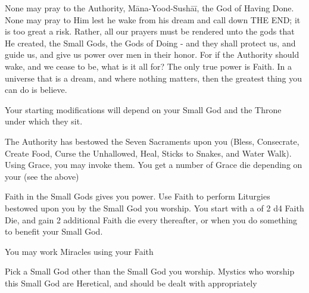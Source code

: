 {  None may pray to the Authority, Māna-Yood-Sushāī, the God of Having Done.  None may pray to Him lest he wake from his dream and call down THE END; it is too great a risk.  Rather, all our prayers must be rendered unto  the gods that He created, the Small Gods, the Gods of Doing - and they shall protect us, and guide us, and give us power over men in their honor.  For if the Authority should wake, and we cease to be, what is it all for?  The only true power is Faith.  In a universe that is a dream, and where nothing matters, then the greatest thing you can do is believe.


  Your starting modifications will depend on your Small God and the Throne under which they sit.\footnotemark


  
  \footnotemark[\value{footnote}] 
  The Authority has bestowed the Seven Sacraments upon you (Bless, Consecrate, Create Food, Curse the Unhallowed, Heal, Sticks to Snakes, and Water Walk). Using Grace, you may invoke them.  You get a number of Grace die depending on your \LVL (see the  above)
  
  \footnotemark[\value{footnote}] 
  Faith in the Small Gods gives you power. Use Faith to perform Liturgies bestowed upon you by the Small God you worship.  You start with a \POOL of 2 d4 Faith Die, and gain 2 additional Faith die every \LVL thereafter, or when you do something to benefit your Small God.

  \footnotemark[\value{footnote}] 
  You may work Miracles using your Faith


  Pick a Small God other than the Small God you worship.  Mystics who worship this Small God are Heretical, and should be dealt with appropriately


}
